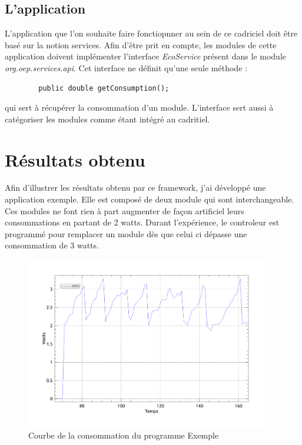 \documentclass[a4paper, 11pt]{report}
\begin{document}
		\subsection{L'application}
L'application que l'on souhaite faire fonctiopnner au sein de ce cadriciel doit être basé sur la notion services. Afin d'être prit en compte, les modules de cette application doivent implémenter l'interface \textit{EcoService} présent dans le module \textit{org.oep.services.api}. Cet interface ne définit qu'une seule méthode :
\begin{verbatim}
        public double getConsumption();
\end{verbatim}
 qui sert à récupérer la consommation d'un module. L'interface sert aussi à catégoriser les modules comme étant intégré au cadritiel.
 
	\section{Résultats obtenu}
Afin d'illustrer les résultats obtenu par ce framework, j'ai développé une application exemple. Elle est composé de deux module qui sont interchangeable. Ces modules ne font rien à part augmenter de façon artificiel leurs consommations en partant de 2 watts. Durant l'expérience, le controleur est programmé pour remplacer un module dès que celui ci dépasse une consommation de 3 watts. 

\begin{figure}
	\centering
	\includegraphics[width=0.95\textwidth]{figures/EcoPattern_Courbe_Exemple.pdf}
	\caption{Courbe de la consommation du programme Exemple}
	\label{CourbeExp}
\end{figure}
\end{document}
